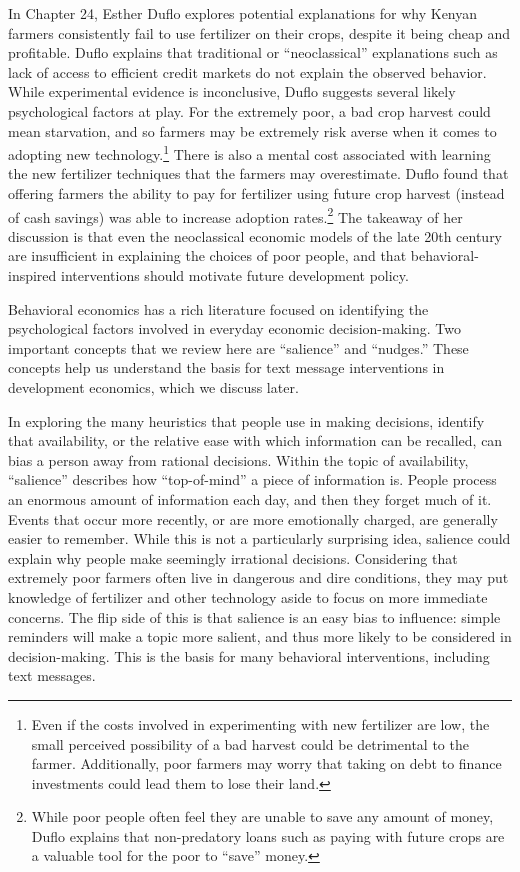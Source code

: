 \documentclass[12pt]{article}
\begin{document}
In \textcite{banerjee_understanding_2006} Chapter 24, Esther Duflo explores potential explanations for why Kenyan farmers consistently fail to use fertilizer on their crops, despite it being cheap and profitable. Duflo explains that traditional or ``neoclassical'' explanations such as lack of access to efficient credit markets do not explain the observed behavior. While experimental evidence is inconclusive, Duflo suggests several likely psychological factors at play. For the extremely poor, a bad crop harvest could mean starvation, and so farmers may be extremely risk averse when it comes to adopting new technology.\footnote{Even if the costs involved in experimenting with new fertilizer are low, the small perceived possibility of a bad harvest could be detrimental to the farmer. Additionally, poor farmers may worry that taking on debt to finance investments could lead them to lose their land.} There is also a mental cost associated with learning the new fertilizer techniques that the farmers may overestimate. Duflo found that offering farmers the ability to pay for fertilizer using future crop harvest (instead of cash savings) was able to increase adoption rates.\footnote{While poor people often feel they are unable to save any amount of money, Duflo explains that non-predatory loans such as paying with future crops are a valuable tool for the poor to ``save'' money.} The takeaway of her discussion is that even the neoclassical economic models of the late 20th century are insufficient in explaining the choices of poor people, and that behavioral-inspired interventions should motivate future development policy. 

Behavioral economics has a rich literature focused on identifying the psychological factors involved in everyday economic decision-making. Two important concepts that we review here are ``salience'' and ``nudges.'' These concepts help us understand the basis for text message interventions in development economics, which we discuss later.

In exploring the many heuristics that people use in making decisions, \textcite{tversky_judgment_1974} identify that availability, or the relative ease with which information can be recalled, can bias a person away from rational decisions. Within the topic of availability, ``salience'' describes how ``top-of-mind'' a piece of information is. People process an enormous amount of information each day, and then they forget much of it. Events that occur more recently, or are more emotionally charged, are generally easier to remember. While this is not a particularly surprising idea, salience could explain why people make seemingly irrational decisions. Considering that extremely poor farmers often live in dangerous and dire conditions, they may put knowledge of fertilizer and other technology aside to focus on more immediate concerns. The flip side of this is that salience is an easy bias to influence: simple reminders will make a topic more salient, and thus more likely to be considered in decision-making. This is the basis for many behavioral interventions, including text messages.
\end{document}
